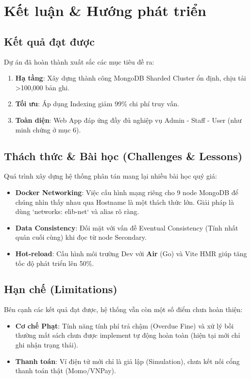 \documentclass[a4paper,12pt]{article}
\begin{document}
\section{Kết luận \& Hướng phát triển}

\subsection{Kết quả đạt được}
Dự án đã hoàn thành xuất sắc các mục tiêu đề ra:
\begin{enumerate}
    \item \textbf{Hạ tầng}: Xây dựng thành công MongoDB Sharded Cluster ổn định, chịu tải >100,000 bản ghi.
    \item \textbf{Tối ưu}: Áp dụng Indexing giảm 99\% chi phí truy vấn.
    \item \textbf{Toàn diện}: Web App đáp ứng đầy đủ nghiệp vụ Admin - Staff - User (như minh chứng ở mục 6).
\end{enumerate}

\subsection{Thách thức \& Bài học (Challenges \& Lessons)}
Quá trình xây dựng hệ thống phân tán mang lại nhiều bài học quý giá:
\begin{itemize}
    \item \textbf{Docker Networking}: Việc cấu hình mạng riêng cho 9 node MongoDB để chúng nhìn thấy nhau qua Hostname là một thách thức lớn. Giải pháp là dùng `networks: elib-net` và alias rõ ràng.
    \item \textbf{Data Consistency}: Đối mặt với vấn đề Eventual Consistency (Tính nhất quán cuối cùng) khi đọc từ node Secondary.
    \item \textbf{Hot-reload}: Cấu hình môi trường Dev với \textbf{Air} (Go) và Vite HMR giúp tăng tốc độ phát triển lên 50\%.
\end{itemize}

\subsection{Hạn chế (Limitations)}
Bên cạnh các kết quả đạt được, hệ thống vẫn còn một số điểm chưa hoàn thiện:
\begin{itemize}
    \item \textbf{Cơ chế Phạt}: Tính năng tính phí trả chậm (Overdue Fine) và xử lý bồi thường mất sách chưa được implement tự động hoàn toàn (hiện tại mới chỉ ghi nhận trạng thái).
    \item \textbf{Thanh toán}: Ví điện tử mới chỉ là giả lập (Simulation), chưa kết nối cổng thanh toán thật (Momo/VNPay).
\end{itemize}
\end{document}
